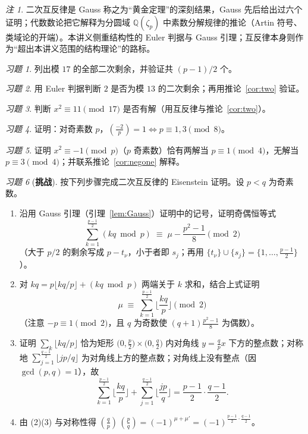 \documentclass[a4paper,11pt]{ctexart}
\numberwithin{equation}{section}
\theoremstyle{plain}
\theoremstyle{definition}
\theoremstyle{remark}
\newtheorem{remark}[theorem]{注}
\newtheorem{exercise}{习题}[section]
\newcommand{\Q}{\mathbb{Q}}
\newcommand{\leg}[2]{\left(\frac{#1}{#2}\right)}
\begin{document}
\begin{remark}
二次互反律是 Gauss 称之为“黄金定理”的深刻结果，Gauss 先后给出过六个证明；代数数论把它解释为分圆域 $\Q(\zeta_p)$ 中素数分解规律的推论（Artin 符号、类域论的开端）。本讲义侧重结构性的 Euler 判据与 Gauss 引理；互反律本身则作为“超出本讲义范围的结构理论”的路标。
\end{remark}

\begin{exercise}\label{ex:6-1}
列出模 $17$ 的全部二次剩余，并验证共 $(p-1)/2$ 个。
\end{exercise}

\begin{exercise}\label{ex:6-2}
用 Euler 判据判断 $2$ 是否为模 $13$ 的二次剩余；再用推论~\ref{cor:two} 验证。
\end{exercise}

\begin{exercise}\label{ex:6-3}
判断 $x^2\equiv 11\pmod{17}$ 是否有解（用互反律与推论~\ref{cor:two}）。
\end{exercise}

\begin{exercise}\label{ex:6-4}
证明：对奇素数 $p$，$\leg{-2}{p}=1\iff p\equiv1,3\pmod8$。
\end{exercise}

\begin{exercise}\label{ex:6-5}
证明 $x^2\equiv -1 \pmod p$（$p$ 奇素数）恰有两解当 $p\equiv1\pmod4$，无解当 $p\equiv3\pmod4$；并联系推论~\ref{cor:negone} 解释。
\end{exercise}

\begin{exercise}[\textbf{挑战}]\label{ex:6-6}
按下列步骤完成二次互反律的 Eisenstein 证明。设 $p<q$ 为奇素数。
\begin{enumerate}[itemsep=0.1em]
  \item 沿用 Gauss 引理（引理~\ref{lem:Gauss}）证明中的记号，证明奇偶恒等式
  \[
  \sum_{k=1}^{\frac{p-1}{2}}(kq\bmod p)\;\equiv\;\mu-\frac{p^2-1}{8}\pmod 2
  \]
  （大于 $p/2$ 的剩余写成 $p-t_\nu$，小于者即 $s_j$；再用 $\{t_\nu\}\cup\{s_j\}=\{1,\dots,\frac{p-1}2\}$）。
  \item 对 $kq=p\lfloor kq/p\rfloor+(kq\bmod p)$ 两端关于 $k$ 求和，结合上式证明
  \[
  \mu\;\equiv\;\sum_{k=1}^{\frac{p-1}2}\Big\lfloor\frac{kq}{p}\Big\rfloor\pmod 2
  \]
  （注意 $-p\equiv1\pmod2$，且 $q$ 为奇数使 $(q+1)\frac{p^2-1}8$ 为偶数）。
  \item 证明 $\sum_k\lfloor kq/p\rfloor$ 恰为矩形 $\bigl(0,\frac p2\bigr)\times\bigl(0,\frac q2\bigr)$ 内对角线 $y=\frac qpx$ 下方的整点数；对称地 $\sum_{j=1}^{\frac{q-1}2}\lfloor jp/q\rfloor$ 为对角线上方的整点数；对角线上没有整点（因 $\gcd(p,q)=1$），故
  \[
  \sum_{k=1}^{\frac{p-1}2}\Big\lfloor\frac{kq}{p}\Big\rfloor+\sum_{j=1}^{\frac{q-1}2}\Big\lfloor\frac{jp}{q}\Big\rfloor=\frac{p-1}{2}\cdot\frac{q-1}{2}.
  \]
  \item 由 (2)(3) 与对称性得 $\leg{q}{p}\,\leg{p}{q}=(-1)^{\mu+\mu'}=(-1)^{\frac{p-1}2\cdot\frac{q-1}2}$。
\end{enumerate}
\end{exercise}
\end{document}
